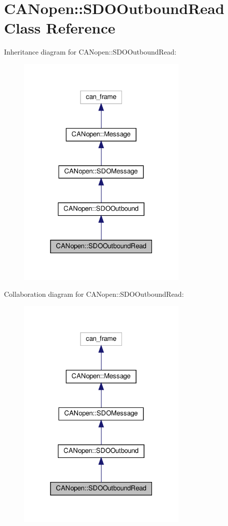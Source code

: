 \hypertarget{class_c_a_nopen_1_1_s_d_o_outbound_read}{}\section{C\+A\+Nopen\+:\+:S\+D\+O\+Outbound\+Read Class Reference}
\label{class_c_a_nopen_1_1_s_d_o_outbound_read}


Inheritance diagram for C\+A\+Nopen\+:\+:S\+D\+O\+Outbound\+Read\+:\nopagebreak
\begin{figure}[H]
\begin{center}
\leavevmode
\includegraphics[width=232pt]{class_c_a_nopen_1_1_s_d_o_outbound_read__inherit__graph}
\end{center}
\end{figure}


Collaboration diagram for C\+A\+Nopen\+:\+:S\+D\+O\+Outbound\+Read\+:\nopagebreak
\begin{figure}[H]
\begin{center}
\leavevmode
\includegraphics[width=232pt]{class_c_a_nopen_1_1_s_d_o_outbound_read__coll__graph}
\end{center}
\end{figure}
